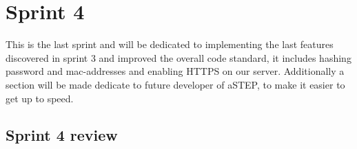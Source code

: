 \chapter{Sprint 4}
This is the last sprint and will be dedicated to implementing the last features discovered in sprint 3 and improved the overall code standard, it includes hashing password and mac-addresses and enabling HTTPS on our server. Additionally a section will be made dedicate to future developer of aSTEP, to make it easier to get up to speed.








\section{Sprint 4 review}